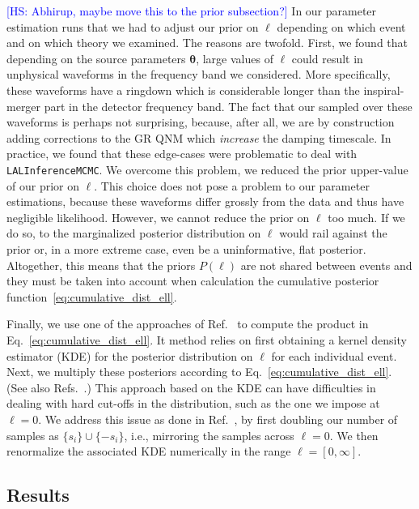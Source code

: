 \documentclass[twocolumn,
               prd,
               aps,
               superscriptaddress,
               tightenlines,
               nofootinbib,
               eqsecnum,
               amsfonts,
               amsmath,
               longbibliography]{revtex4-1}
\newcommand{\btheta}{\bm{\theta}}
\newcommand{\hs}[1]{{\textcolor{blue}{{[HS: #1]}} }}
\begin{document}
%
\hs{Abhirup, maybe move this to the prior subsection?}
In our parameter estimation runs that we had to adjust our prior on $\ell$ depending on which event and
on which theory we examined.
%
The reasons are twofold.
%
%
First, we found that depending on the source parameters $\btheta$,
large values of $\ell$ could result in unphysical waveforms in the frequency
band we considered. More specifically, these waveforms have a ringdown which is
considerable longer than the inspiral-merger part in the detector frequency band.
%
The fact that our sampled over these waveforms is perhaps not surprising,
because, after all, we are by construction adding corrections to the GR QNM
which \emph{increase} the damping timescale.
%
In practice, we found that these edge-cases were problematic to deal with
\texttt{LALInferenceMCMC}.
%
We overcome this problem, we reduced the prior upper-value of our prior on $\ell$.
%
This choice does not pose a problem to our parameter estimations, because these
waveforms differ grossly from the data and thus have negligible likelihood.
%
%
However, we cannot reduce the prior on $\ell$ too much. If we do so,
to the marginalized posterior distribution on $\ell$ would rail against
the prior or, in a more extreme case, even be a uninformative, flat posterior.
%
%
Altogether, this means that the priors $P(\ell)$ are not shared between events and
they must be taken into account when calculation the cumulative posterior function~\eqref{eq:cumulative_dist_ell}.

Finally, we use one of the approaches of Ref.~\cite{Perkins:2021mhb} to
compute the product in Eq.~\eqref{eq:cumulative_dist_ell}.
%
It method relies on first obtaining a kernel density estimator (KDE) for
the posterior distribution on $\ell$ for each individual event.
%
Next, we multiply these posteriors according to Eq.~\eqref{eq:cumulative_dist_ell}.
%
(See also Refs.~\cite{DelPozzo:2011pg,Cardenas-Avendano:2019zxd,Carullo:2021dui}.)
%
This approach based on the KDE can have difficulties in dealing with hard cut-offs in the
distribution, such as the one we impose at $\ell = 0$. We address this issue as
done in Ref.~\cite{Perkins:2021mhb}, by first doubling our number of samples as
$\{ s_i \} \cup \{ - s_i \}$, i.e., mirroring the samples across $\ell = 0$.
%
We then renormalize the associated KDE numerically in the range $\ell = [0, \infty]$.

\subsection{Results}
\end{document}
